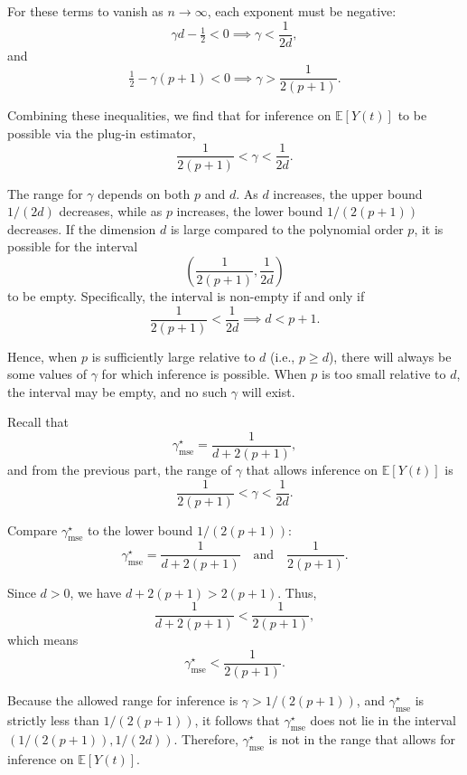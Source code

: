 \documentclass{article}
\begin{document}
For these terms to vanish as \( n \to \infty \), each exponent must be negative:
\[
\gamma d - \tfrac{1}{2} < 0 \implies \gamma < \frac{1}{2d},
\]
and
\[
\tfrac{1}{2} - \gamma(p+1) < 0 \implies \gamma > \frac{1}{2(p+1)}.
\]

Combining these inequalities, we find that for inference on \(\mathbb{E}[Y(t)]\) to be possible via the plug-in estimator,
\[
\frac{1}{2(p+1)} < \gamma < \frac{1}{2d}.
\]

The range for \(\gamma\) depends on both \( p \) and \( d \). As \( d \) increases, the upper bound \(1/(2d)\) decreases, while as \( p \) increases, the lower bound \(1/(2(p+1))\) decreases. If the dimension \( d \) is large compared to the polynomial order \( p \), it is possible for the interval
\[
\left(\frac{1}{2(p+1)}, \frac{1}{2d}\right)
\]
to be empty. Specifically, the interval is non-empty if and only if
\[
\frac{1}{2(p+1)} < \frac{1}{2d} \implies d < p+1.
\]

Hence, when \( p \) is sufficiently large relative to \( d \) (i.e., \( p \ge d \)), there will always be some values of \(\gamma\) for which inference is possible. When \( p \) is too small relative to \( d \), the interval may be empty, and no such \(\gamma\) will exist.

Recall that 
\[
\gamma^\star_{\text{mse}} = \frac{1}{d + 2(p+1)},
\]
and from the previous part, the range of \(\gamma\) that allows inference on \(\mathbb{E}[Y(t)]\) is
\[
\frac{1}{2(p+1)} < \gamma < \frac{1}{2d}.
\]

Compare \(\gamma^\star_{\text{mse}}\) to the lower bound \( 1/(2(p+1)) \):
\[
\gamma^\star_{\text{mse}} = \frac{1}{d + 2(p+1)} \quad \text{and} \quad \frac{1}{2(p+1)}.
\]

Since \(d>0\), we have \(d+2(p+1) > 2(p+1)\). Thus,
\[
\frac{1}{d + 2(p+1)} < \frac{1}{2(p+1)},
\]
which means
\[
\gamma^\star_{\text{mse}} < \frac{1}{2(p+1)}.
\]

Because the allowed range for inference is \(\gamma > 1/(2(p+1))\), and \(\gamma^\star_{\text{mse}}\) is strictly less than \(1/(2(p+1))\), it follows that \(\gamma^\star_{\text{mse}}\) does not lie in the interval \((1/(2(p+1)), 1/(2d))\). Therefore, \(\gamma^\star_{\text{mse}}\) is not in the range that allows for inference on \(\mathbb{E}[Y(t)]\).
\end{document}
